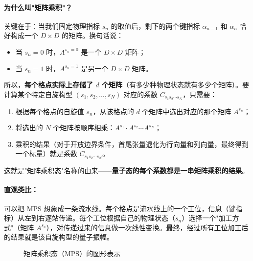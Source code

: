 \documentclass[12pt,a4paper]{ctexart}
\begin{document}
\paragraph{为什么叫"矩阵乘积"？} 关键在于：当我们固定物理指标 $s_n$ 的取值后，剩下的两个键指标 $\alpha_{n-1}$ 和 $\alpha_n$ 恰好构成一个 $D \times D$ 的矩阵。换句话说：
\begin{itemize}
    \item 当 $s_n = 0$ 时，$A^{s_n=0}$ 是一个 $D \times D$ 矩阵；
    \item 当 $s_n = 1$ 时，$A^{s_n=1}$ 是另一个 $D \times D$ 矩阵。
\end{itemize}
所以，\textbf{每个格点实际上存储了 $d$ 个矩阵}（有多少种物理状态就有多少个矩阵）。要计算某个特定自旋构型 $(s_1, s_2, \ldots, s_N)$ 对应的系数 $C_{s_1 s_2 \cdots s_N}$，只需要：
\begin{enumerate}
    \item 根据每个格点的自旋值 $s_n$，从该格点的 $d$ 个矩阵中选出对应的那个矩阵 $A^{s_n}$；
    \item 将选出的 $N$ 个矩阵按顺序相乘：$A^{s_1} \cdot A^{s_2} \cdots A^{s_N}$；
    \item 乘积的结果（对于开放边界条件，首尾张量退化为行向量和列向量，最终得到一个标量）就是系数 $C_{s_1 s_2 \cdots s_N}$。
\end{enumerate}
这就是"矩阵乘积态"名称的由来——\textbf{量子态的每个系数都是一串矩阵乘积的结果}。

\paragraph{直观类比：} 可以把 MPS 想象成一条流水线。每个格点是流水线上的一个工位，信息（键指标）从左到右逐站传递。每个工位根据自己的物理状态（$s_n$）选择一个"加工方式"（矩阵 $A^{s_n}$），对传递过来的信息做一次线性变换。最终，经过所有工位加工后的结果就是该自旋构型的量子振幅。

\begin{figure}[H]
\centering
{}
\caption{矩阵乘积态（MPS）的图形表示}
\end{figure}
\end{document}

